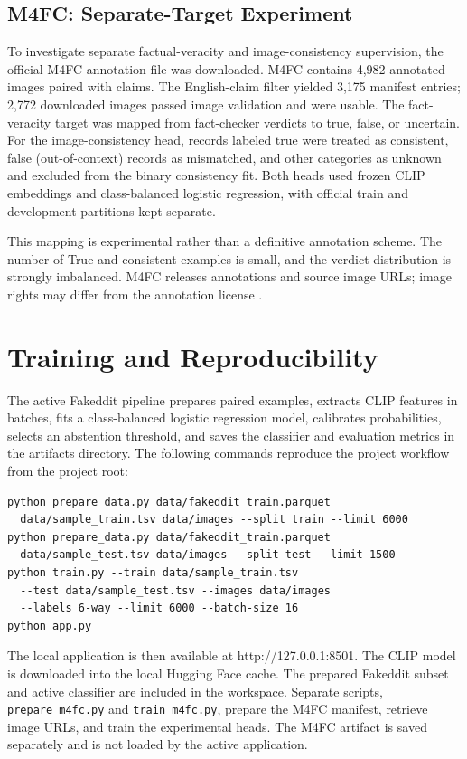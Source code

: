 \documentclass[conference]{IEEEtran}
\begin{document}
\subsection{M4FC: Separate-Target Experiment}
To investigate separate factual-veracity and image-consistency supervision, the official M4FC annotation file was downloaded. M4FC contains 4,982 annotated images paired with claims. The English-claim filter yielded 3,175 manifest entries; 2,772 downloaded images passed image validation and were usable. The fact-veracity target was mapped from fact-checker verdicts to true, false, or uncertain. For the image-consistency head, records labeled true were treated as consistent, false (out-of-context) records as mismatched, and other categories as unknown and excluded from the binary consistency fit. Both heads used frozen CLIP embeddings and class-balanced logistic regression, with official train and development partitions kept separate.

This mapping is experimental rather than a definitive annotation scheme. The number of True and consistent examples is small, and the verdict distribution is strongly imbalanced. M4FC releases annotations and source image URLs; image rights may differ from the annotation license \cite{m4fc_repo}.

\section{Training and Reproducibility}
The active Fakeddit pipeline prepares paired examples, extracts CLIP features in batches, fits a class-balanced logistic regression model, calibrates probabilities, selects an abstention threshold, and saves the classifier and evaluation metrics in the artifacts directory. The following commands reproduce the project workflow from the project root:
\begin{verbatim}
python prepare_data.py data/fakeddit_train.parquet
  data/sample_train.tsv data/images --split train --limit 6000
python prepare_data.py data/fakeddit_train.parquet
  data/sample_test.tsv data/images --split test --limit 1500
python train.py --train data/sample_train.tsv
  --test data/sample_test.tsv --images data/images
  --labels 6-way --limit 6000 --batch-size 16
python app.py
\end{verbatim}
The local application is then available at http://127.0.0.1:8501. The CLIP model is downloaded into the local Hugging Face cache. The prepared Fakeddit subset and active classifier are included in the workspace. Separate scripts, \texttt{prepare\_m4fc.py} and \texttt{train\_m4fc.py}, prepare the M4FC manifest, retrieve image URLs, and train the experimental heads. The M4FC artifact is saved separately and is not loaded by the active application.
\end{document}

